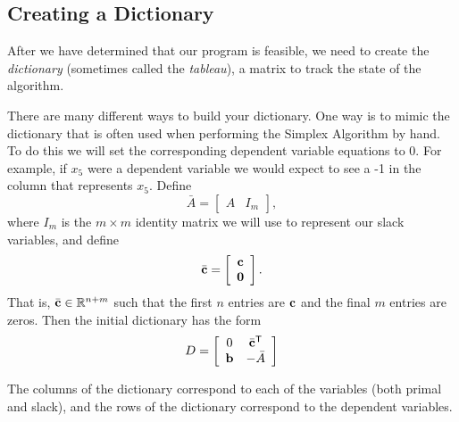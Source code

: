
\subsection*{Creating a Dictionary} %

After we have determined that our program is feasible, we need to create the \emph{dictionary} (sometimes called the \emph{tableau}), a matrix to track the state of the algorithm.

There are many different ways to build your dictionary.
One way is to mimic the dictionary that is often used when performing the Simplex Algorithm by hand. To do this we will set the corresponding dependent variable equations to 0. For example, if $x_5$ were a dependent variable we would expect to see a -1 in the column that represents $x_5$.
Define \[\bar{A} = \left[\begin{array}{cc} A & I_m \end{array}\right],\]
where $I_m$ is the $m \times m$ identity matrix we will use to represent our slack variables, and define
\[\bar{\mathbf{c}} = \left[\begin{array}{c}\mathbf{c}\\ \mathbf{0}\end{array}\right].\]
That is, $\bar{\mathbf{c}} \in \mathbb{R}^{n+m}$ such that the first $n$ entries are $\mathbf{c}$ and the final $m$ entries are zeros.
Then the initial dictionary has the form
\begin{equation}
D =
\left[\begin{array}{ccc}
0  & \bar{\mathbf{c}}^{\mathsf T} \\
\mathbf{b} &  -\bar{A} 
\end{array}\right]
\label{eqn:hand_tab}
\end{equation}

The columns of the dictionary correspond to each of the variables (both primal and slack), and the rows of the dictionary correspond to the dependent variables.

